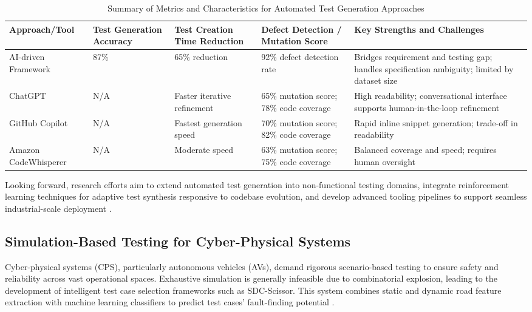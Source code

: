 \documentclass[sigconf]{acmart}
\begin{document}
\begin{table*}[htbp]
\centering
\caption{Summary of Metrics and Characteristics for Automated Test Generation Approaches}
\label{tab:test_generation_summary}
\begin{adjustbox}{max width=\textwidth}
\begin{tabular}{@{}lllll@{}}
\toprule
Approach/Tool & Test Generation Accuracy & Test Creation Time Reduction & Defect Detection / Mutation Score & Key Strengths and Challenges \\ \midrule
AI-driven Framework \cite{ref30} & 87\% & 65\% reduction & 92\% defect detection rate & Bridges requirement and testing gap; handles specification ambiguity; limited by dataset size \\ 
ChatGPT \cite{ref32} & N/A & Faster iterative refinement & 65\% mutation score; 78\% code coverage & High readability; conversational interface supports human-in-the-loop refinement \\ 
GitHub Copilot \cite{ref32} & N/A & Fastest generation speed & 70\% mutation score; 82\% code coverage & Rapid inline snippet generation; trade-off in readability \\ 
Amazon CodeWhisperer \cite{ref32} & N/A & Moderate speed & 63\% mutation score; 75\% code coverage & Balanced coverage and speed; requires human oversight \\ \bottomrule
\end{tabular}
\end{adjustbox}
\end{table*}

Looking forward, research efforts aim to extend automated test generation into non-functional testing domains, integrate reinforcement learning techniques for adaptive test synthesis responsive to codebase evolution, and develop advanced tooling pipelines to support seamless industrial-scale deployment \cite{ref30}.

\subsection{Simulation-Based Testing for Cyber-Physical Systems}

Cyber-physical systems (CPS), particularly autonomous vehicles (AVs), demand rigorous scenario-based testing to ensure safety and reliability across vast operational spaces. Exhaustive simulation is generally infeasible due to combinatorial explosion, leading to the development of intelligent test case selection frameworks such as SDC-Scissor. This system combines static and dynamic road feature extraction with machine learning classifiers to predict test cases’ fault-finding potential \cite{ref29}.
\end{document}
